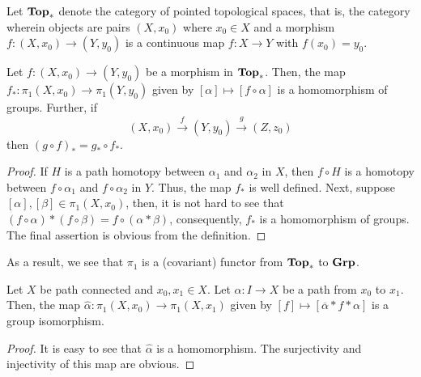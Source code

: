 Let $\mathbf{Top}_*$ denote the category of pointed topological spaces, that is, the category wherein objects are pairs $(X,x_0)$ where $x_0\in X$ and a morphism $f:(X,x_0)\to (Y,y_0)$ is a continuous map $f: X\to Y$ with $f(x_0) = y_0$.

\begin{proposition}
    Let $f: (X,x_0)\to (Y,y_0)$ be a morphism in $\mathbf{Top}_*$. Then, the map $f_*:\pi_1(X,x_0)\to\pi_1(Y,y_0)$ given by $[\alpha]\mapsto[f\circ\alpha]$ is a homomorphism of groups. Further, if 
    \begin{equation*}
        (X,x_0)\stackrel{f}{\longrightarrow}(Y,y_0)\stackrel{g}{\longrightarrow}(Z,z_0)
    \end{equation*}
    then $(g\circ f)_* = g_*\circ f_*$.
\end{proposition}
\begin{proof}
    If $H$ is a path homotopy between $\alpha_1$ and $\alpha_2$ in $X$, then $f\circ H$ is a homotopy between $f\circ\alpha_1$ and $f\circ\alpha_2$ in $Y$. Thus, the map $f_*$ is well defined. Next, suppose $[\alpha],[\beta]\in\pi_1(X,x_0)$, then, it is not hard to see that $(f\circ\alpha)*(f\circ\beta) = f\circ(\alpha * \beta)$, consequently, $f_*$ is a homomorphism of groups. The final assertion is obvious from the definition.
\end{proof}

As a result, we see that $\pi_1$ is a (covariant) functor from $\mathbf{Top}_*$ to $\mathbf{Grp}$.

\begin{theorem}
    Let $X$ be path connected and $x_0,x_1\in X$. Let $\alpha: I\to X$ be a path from $x_0$ to $x_1$. Then, the map $\hat\alpha:\pi_1(X,x_0)\to\pi_1(X,x_1)$ given by $[f]\mapsto[\overline\alpha*f*\alpha]$ is a group isomorphism.
\end{theorem}
\begin{proof}
    It is easy to see that $\hat\alpha$ is a homomorphism. The surjectivity and injectivity of this map are obvious.
\end{proof}

